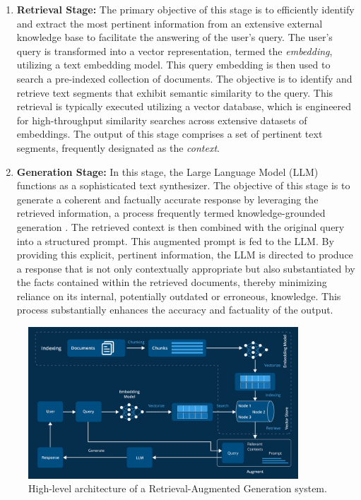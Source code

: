 \begin{enumerate}
    \item \textbf{Retrieval Stage:} The primary objective of this stage is to efficiently identify and extract the most pertinent information from an extensive external knowledge base to facilitate the answering of the user's query. The user's query is transformed into a vector representation, termed the \textit{embedding}, utilizing a text embedding model. This query embedding is then used to search a pre-indexed collection of documents. The objective is to identify and retrieve text segments that exhibit semantic similarity to the query. This retrieval is typically executed utilizing a vector database, which is engineered for high-throughput similarity searches across extensive datasets of embeddings. The output of this stage comprises a set of pertinent text segments, frequently designated as the \textit{context}.

    
    \item \textbf{Generation Stage:} In this stage, the Large Language Model (LLM) functions as a sophisticated text synthesizer. The objective of this stage is to generate a coherent and factually accurate response by leveraging the retrieved information, a process frequently termed knowledge-grounded generation \autocite{yu2022survey}. The retrieved context is then combined with the original query into a structured prompt. This augmented prompt is fed to the LLM. By providing this explicit, pertinent information, the LLM is directed to produce a response that is not only contextually appropriate but also substantiated by the facts contained within the retrieved documents, thereby minimizing reliance on its internal, potentially outdated or erroneous, knowledge. This process substantially enhances the accuracy and factuality of the output.
\end{enumerate}

\begin{figure}[!htbp]
    \centering
    \includegraphics[width=0.9\textwidth]{images/chapter2/rag_architecture_2.png}
    \caption{High-level architecture of a Retrieval-Augmented Generation system.}
    \label{fig:rag_architecture}
\end{figure}

